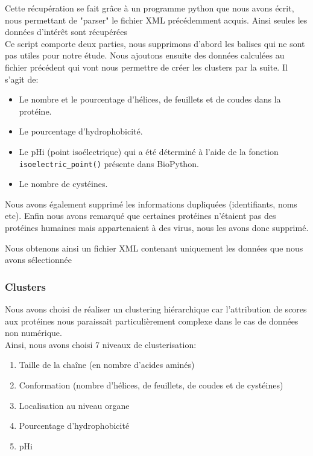 Cette récupération se fait grâce à un programme python que nous avons écrit, nous permettant de "parser" le fichier XML précédemment acquis. Ainsi seules les données d'intérêt sont récupérées\\

Ce script comporte deux parties, nous supprimons d'abord les balises qui ne sont pas utiles pour notre étude.
Nous ajoutons ensuite des données calculées au fichier précédent qui vont nous permettre de créer les clusters par la suite. Il s'agit de:
\begin{itemize}
\item Le nombre et le pourcentage d'hélices, de feuillets et de coudes dans la protéine.
\item Le pourcentage d'hydrophobicité.
\item Le pHi (point isoélectrique) qui a été déterminé à l'aide de la fonction\\ \texttt{isoelectric\_point()} présente dans BioPython.
\item Le nombre de cystéines.
\end{itemize}

Nous avons également supprimé les informations dupliquées (identifiants, noms etc).
Enfin nous avons remarqué que certaines protéines n'étaient pas des protéines humaines mais appartenaient à des virus, nous les avons donc supprimé.

Nous obtenons ainsi un fichier XML contenant uniquement les données que nous avons sélectionnée


\subsubsection*{Clusters}
Nous avons choisi de réaliser un clustering hiérarchique car l'attribution de scores aux protéines nous paraissait particulièrement complexe dans le cas de données non numérique.\\%
Ainsi, nous avons choisi 7 niveaux de clusterisation:
\begin{enumerate}
\item Taille de la chaîne (en nombre d'acides aminés)
\item Conformation (nombre d'hélices, de feuillets, de coudes et de cystéines)
\item Localisation au niveau organe
\item Pourcentage d'hydrophobicité
\item pHi
\end{enumerate}



